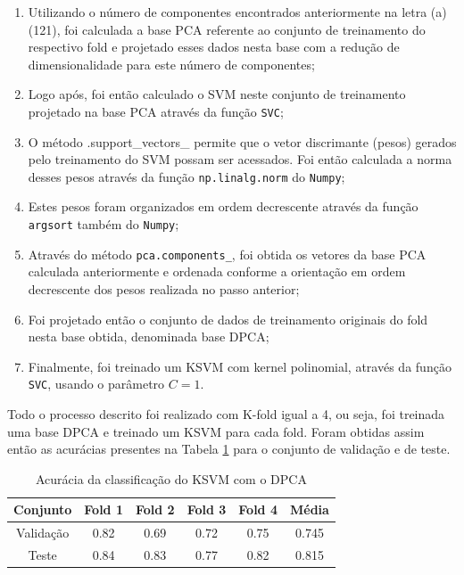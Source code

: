\documentclass[]{abntex2}
\begin{document}
\begin{enumerate}
    \item Utilizando o número de componentes encontrados anteriormente na letra (a) (121), foi calculada a base PCA referente ao conjunto de treinamento do respectivo fold e projetado esses dados nesta base com a redução de dimensionalidade para este número de componentes;
    \item Logo após, foi então calculado o SVM neste conjunto de treinamento projetado na base PCA através da função \texttt{SVC};
    \item O método {.support\_vectors\_} permite que o vetor discrimante (pesos) gerados pelo treinamento do SVM possam ser acessados. Foi então calculada a norma desses pesos através da função \texttt{np.linalg.norm} do \texttt{Numpy};
    \item Estes pesos foram organizados em ordem decrescente através da função \texttt{argsort} também do \texttt{Numpy};
    \item Através do método \texttt{pca.components\_}, foi obtida os vetores da base PCA calculada anteriormente e ordenada conforme a orientação em ordem decrescente dos pesos realizada no passo anterior;
    \item Foi projetado então o conjunto de dados de treinamento originais do fold nesta base obtida, denominada base DPCA;
    \item Finalmente, foi treinado um KSVM com kernel polinomial, através da função \texttt{SVC}, usando o parâmetro $C=1$.
\end{enumerate}

 Todo o processo descrito foi realizado com K-fold igual a 4, ou seja, foi treinada uma base DPCA e treinado um KSVM para cada fold. Foram obtidas assim então as acurácias presentes na Tabela \ref{tab:dpca_ksvm} para o conjunto de validação e de teste.

\begin{table}[H]
    \centering
    \begin{tabular}{|c|c|c|c|c|c|}
    \hline
    \rowcolor[HTML]{C0C0C0} 
    Conjunto                          & Fold 1 & Fold 2 & Fold 3 & Fold 4 & Média  \\ \hline
    \cellcolor[HTML]{C0C0C0}Validação & 0.82   & 0.69  & 0.72   & 0.75   & 0.745  \\ \hline
    \cellcolor[HTML]{C0C0C0}Teste     & 0.84   & 0.83   & 0.77   & 0.82   & 0.815 \\ \hline
    \end{tabular}
    \caption{Acurácia da classificação do KSVM com o DPCA}
    \label{tab:dpca_ksvm}
\end{table}
\end{document}
